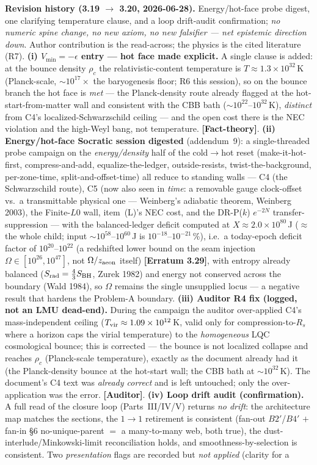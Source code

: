\documentclass[11pt]{article}
\newcommand{\Auditor}{\textbf{\textcolor{teal!55!black}{[Auditor]}}}
\newcommand{\factth}{\textcolor{green!40!black}{\textbf{[Fact-theory]}}}
\begin{document}
{\smallskip\noindent\textbf{Revision history (3.19 $\to$ 3.20, 2026-06-28).} Energy/hot-face probe digest, one clarifying temperature clause, and a loop drift-audit confirmation; \emph{no numeric spine change, no new axiom, no new falsifier --- net epistemic direction down}. Author contribution is the read-across; the physics is the cited literature (R7). \textbf{(i) $V_{\min}=-\epsilon$ entry --- hot face made explicit.} A single clause is added: at the bounce density $\rho_c$ the relativistic-content temperature is $T\approx1.3\times10^{32}$\,K (Planck-scale, $\sim10^{17}\times$ the baryogenesis floor; R6 this session), so on the bounce branch the hot face is \emph{met} --- the Planck-density route already flagged at the hot-start-from-matter wall and consistent with the CBB bath ($\sim10^{22}$--$10^{32}$\,K), \emph{distinct} from C4's localized-Schwarzschild ceiling --- and the open cost there is the NEC violation and the high-Weyl bang, not temperature. \factth. \textbf{(ii) Energy/hot-face Socratic session digested} (addendum~9): a single-threaded probe campaign on the \emph{energy/density} half of the cold$\to$hot reset (make-it-hot-first, compress-and-add, equalize-the-ledger, outside-resists, twist-the-background, per-zone-time, split-and-offset-time) all reduce to standing walls --- C4 (the Schwarzschild route), C5 (now also seen in \emph{time}: a removable gauge clock-offset vs.\ a transmittable physical one --- Weinberg's adiabatic theorem, Weinberg 2003), the Finite-$L0$ wall, item~(L)'s NEC cost, and the DR-P($k$) $e^{-2N}$ transfer-suppression --- with the balanced-ledger deficit computed at $X\approx2.0\times10^{80}$\,J ($\approx$ the whole child; input $\sim10^{58}$--$10^{60}$\,J is $10^{-18}$--$10^{-21}$\,\%), i.e.\ a today-epoch deficit factor of $10^{20}$--$10^{22}$ (a redshifted lower bound on the seam injection $\Omega\in[10^{26},10^{47}]$, not $\Omega/z_{\rm aeon}$ itself) \textbf{[Erratum 3.29]}, with entropy already balanced ($S_{\rm rad}=\tfrac43 S_{\rm BH}$, Zurek 1982) and energy not conserved across the boundary (Wald 1984), so $\Omega$ remains the single unsupplied locus --- a negative result that hardens the Problem-A boundary. \textbf{(iii) Auditor R4 fix (logged, not an LMU dead-end).} During the campaign the auditor over-applied C4's mass-independent ceiling ($T_{\rm vir}\approx1.09\times10^{12}$\,K, valid only for compression-to-$R_s$ where a horizon caps the virial temperature) to the \emph{homogeneous} LQC cosmological bounce; this is corrected --- the bounce is not localized collapse and reaches $\rho_c$ (Planck-scale temperature), exactly as the document already had it (the Planck-density bounce at the hot-start wall; the CBB bath at $\sim10^{32}$\,K). The document's C4 text was \emph{already correct} and is left untouched; only the over-application was the error. \Auditor. \textbf{(iv) Loop drift audit (confirmation).} A full read of the closure loop (Parts~III/IV/V) returns \emph{no drift}: the architecture map matches the sections, the $1\to1$ retirement is consistent (fan-out $B2'$/$B4'$ $+$ fan-in \S6 no-unique-parent $=$ a many-to-many web, both true), the dust-interlude/Minkowski-limit reconciliation holds, and smoothness-by-selection is consistent. Two \emph{presentation} flags are recorded but \emph{not applied} (clarity for a }
\end{document}
